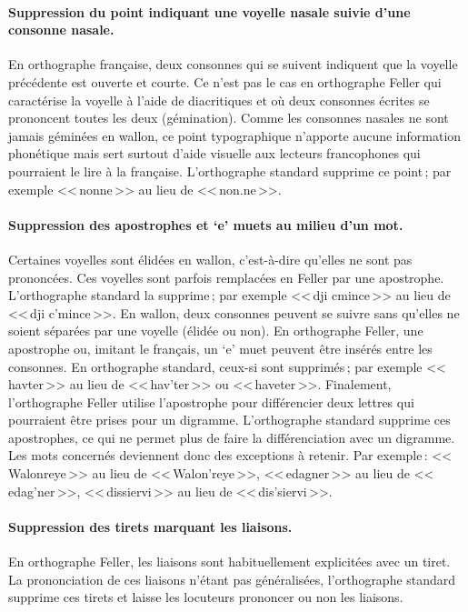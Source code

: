\documentclass[french]{article}
\begin{document}
\paragraph{Suppression du point indiquant une voyelle nasale suivie d'une consonne nasale.} En orthographe française, deux consonnes qui se suivent indiquent que la voyelle précédente est ouverte et courte. Ce n'est pas le cas en orthographe Feller qui caractérise la voyelle à l'aide de diacritiques et où deux consonnes écrites se prononcent toutes les deux (gémination). Comme les consonnes nasales ne sont jamais géminées en wallon, ce point typographique n'apporte aucune information phonétique mais sert surtout d'aide visuelle aux lecteurs francophones qui pourraient le lire à la française. L'orthographe standard supprime ce point\,; par exemple <<\,nonne\,>> au lieu de <<\,non.ne\,>>.

\paragraph{Suppression des apostrophes et `e' muets au milieu d'un mot.} Certaines voyelles sont élidées en wallon, c'est-à-dire qu'elles ne sont pas prononcées. Ces voyelles sont parfois remplacées en Feller par une apostrophe. L'orthographe standard la supprime\,; par exemple <<\,dji cmince\,>> au lieu de <<\,dji c'mince\,>>. En wallon, deux consonnes peuvent se suivre sans qu'elles ne soient séparées par une voyelle (élidée ou non). En orthographe Feller, une apostrophe ou, imitant le français, un `e' muet peuvent être insérés entre les consonnes. En orthographe standard, ceux-si sont supprimés\,; par exemple <<\,havter\,>> au lieu de <<\,hav'ter\,>> ou <<\,haveter\,>>. Finalement, l'orthographe Feller utilise l'apostrophe pour différencier deux lettres qui pourraient être prises pour un digramme. L'orthographe standard supprime ces apostrophes, ce qui ne permet plus de faire la différenciation avec un digramme. Les mots concernés deviennent donc des exceptions à retenir. Par exemple\,: <<\,Walonreye\,>> au lieu de <<\,Walon'reye\,>>, <<\,edagner\,>> au lieu de <<\,edag'ner\,>>, <<\,dissiervi\,>> au lieu de <<\,dis'siervi\,>>.

\paragraph{Suppression des tirets marquant les liaisons.} En orthographe Feller, les liaisons sont habituellement explicitées avec un tiret. La prononciation de ces liaisons n'étant pas généralisées, l'orthographe standard supprime ces tirets et laisse les locuteurs prononcer ou non les liaisons.
\end{document}
